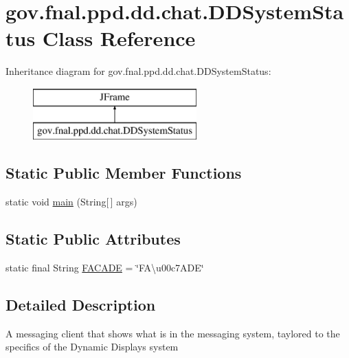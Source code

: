 \hypertarget{classgov_1_1fnal_1_1ppd_1_1dd_1_1chat_1_1DDSystemStatus}{\section{gov.\-fnal.\-ppd.\-dd.\-chat.\-D\-D\-System\-Status Class Reference}
\label{classgov_1_1fnal_1_1ppd_1_1dd_1_1chat_1_1DDSystemStatus}
}
Inheritance diagram for gov.\-fnal.\-ppd.\-dd.\-chat.\-D\-D\-System\-Status\-:\begin{figure}[H]
\begin{center}
\leavevmode
\includegraphics[height=2.000000cm]{classgov_1_1fnal_1_1ppd_1_1dd_1_1chat_1_1DDSystemStatus}
\end{center}
\end{figure}
\subsection*{Static Public Member Functions}
\begin{DoxyCompactItemize}
\item 
static void \hyperlink{classgov_1_1fnal_1_1ppd_1_1dd_1_1chat_1_1DDSystemStatus_a5d501562eb6c4e85b7be34d7477eb4d1}{main} (String\mbox{[}$\,$\mbox{]} args)
\end{DoxyCompactItemize}
\subsection*{Static Public Attributes}
\begin{DoxyCompactItemize}
\item 
static final String \hyperlink{classgov_1_1fnal_1_1ppd_1_1dd_1_1chat_1_1DDSystemStatus_a4a11894738a02fa522ea3ca3b8523cae}{F\-A\-C\-A\-D\-E} = \char`\"{}F\-A\textbackslash{}u00c7\-A\-D\-E\char`\"{}
\end{DoxyCompactItemize}


\subsection{Detailed Description}
A messaging client that shows what is in the messaging system, taylored to the specifics of the Dynamic Displays system 

